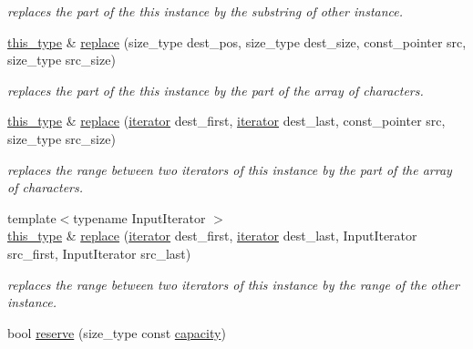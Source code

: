 \begin{DoxyCompactItemize}
\begin{DoxyCompactList}\small\item\em replaces the part of the this instance by the substring of other instance. \end{DoxyCompactList}\item 
\hypertarget{classhryky_1_1_string_af903fdf0a575a50bdedda445c31d376e}{\hyperlink{classhryky_1_1_string}{this\-\_\-type} \& \hyperlink{classhryky_1_1_string_af903fdf0a575a50bdedda445c31d376e}{replace} (size\-\_\-type dest\-\_\-pos, size\-\_\-type dest\-\_\-size, const\-\_\-pointer src, size\-\_\-type src\-\_\-size)}\label{classhryky_1_1_string_af903fdf0a575a50bdedda445c31d376e}

\begin{DoxyCompactList}\small\item\em replaces the part of the this instance by the part of the array of characters. \end{DoxyCompactList}\item 
\hypertarget{classhryky_1_1_string_a212bb5e5302c2675650dd4f55878ba25}{\hyperlink{classhryky_1_1_string}{this\-\_\-type} \& \hyperlink{classhryky_1_1_string_a212bb5e5302c2675650dd4f55878ba25}{replace} (\hyperlink{classhryky_1_1iterator_1_1random_1_1_mutable}{iterator} dest\-\_\-first, \hyperlink{classhryky_1_1iterator_1_1random_1_1_mutable}{iterator} dest\-\_\-last, const\-\_\-pointer src, size\-\_\-type src\-\_\-size)}\label{classhryky_1_1_string_a212bb5e5302c2675650dd4f55878ba25}

\begin{DoxyCompactList}\small\item\em replaces the range between two iterators of this instance by the part of the array of characters. \end{DoxyCompactList}\item 
\hypertarget{classhryky_1_1_string_a8f29b486917c6e7913120be286c74c4d}{{\footnotesize template$<$typename Input\-Iterator $>$ }\\\hyperlink{classhryky_1_1_string}{this\-\_\-type} \& \hyperlink{classhryky_1_1_string_a8f29b486917c6e7913120be286c74c4d}{replace} (\hyperlink{classhryky_1_1iterator_1_1random_1_1_mutable}{iterator} dest\-\_\-first, \hyperlink{classhryky_1_1iterator_1_1random_1_1_mutable}{iterator} dest\-\_\-last, Input\-Iterator src\-\_\-first, Input\-Iterator src\-\_\-last)}\label{classhryky_1_1_string_a8f29b486917c6e7913120be286c74c4d}

\begin{DoxyCompactList}\small\item\em replaces the range between two iterators of this instance by the range of the other instance. \end{DoxyCompactList}\item 
\hypertarget{classhryky_1_1_string_aae6ce7131e8bb4c2cf03689a6a183b8d}{bool \hyperlink{classhryky_1_1_string_aae6ce7131e8bb4c2cf03689a6a183b8d}{reserve} (size\-\_\-type const \hyperlink{classhryky_1_1_string_afe570a5245b8ae9fb91ab0aebecc5b5a}{capacity})}\label{classhryky_1_1_string_aae6ce7131e8bb4c2cf03689a6a183b8d}


\end{DoxyCompactItemize}
